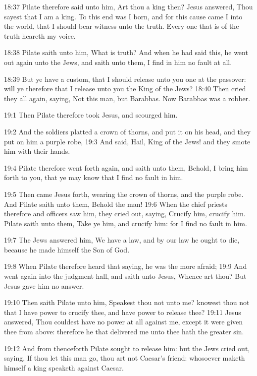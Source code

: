 18:37 Pilate therefore said unto him, Art thou a king then? Jesus answered, Thou sayest that I am a king. To this end was I born, and for this cause came I into the world, that I should bear witness unto the truth. Every one that is of the truth heareth my voice.

18:38 Pilate saith unto him, What is truth? And when he had said this, he went out again unto the Jews, and saith unto them, I find in him no fault at all.

18:39 But ye have a custom, that I should release unto you one at the passover: will ye therefore that I release unto you the King of the Jews?  18:40 Then cried they all again, saying, Not this man, but Barabbas. Now Barabbas was a robber.

19:1 Then Pilate therefore took Jesus, and scourged him.

19:2 And the soldiers platted a crown of thorns, and put it on his head, and they put on him a purple robe, 19:3 And said, Hail, King of the Jews! and they smote him with their hands.

19:4 Pilate therefore went forth again, and saith unto them, Behold, I bring him forth to you, that ye may know that I find no fault in him.

19:5 Then came Jesus forth, wearing the crown of thorns, and the purple robe. And Pilate saith unto them, Behold the man!  19:6 When the chief priests therefore and officers saw him, they cried out, saying, Crucify him, crucify him. Pilate saith unto them, Take ye him, and crucify him: for I find no fault in him.

19:7 The Jews answered him, We have a law, and by our law he ought to die, because he made himself the Son of God.

19:8 When Pilate therefore heard that saying, he was the more afraid; 19:9 And went again into the judgment hall, and saith unto Jesus, Whence art thou? But Jesus gave him no answer.

19:10 Then saith Pilate unto him, Speakest thou not unto me? knowest thou not that I have power to crucify thee, and have power to release thee?  19:11 Jesus answered, Thou couldest have no power at all against me, except it were given thee from above: therefore he that delivered me unto thee hath the greater sin.

19:12 And from thenceforth Pilate sought to release him: but the Jews cried out, saying, If thou let this man go, thou art not Caesar's friend: whosoever maketh himself a king speaketh against Caesar.

